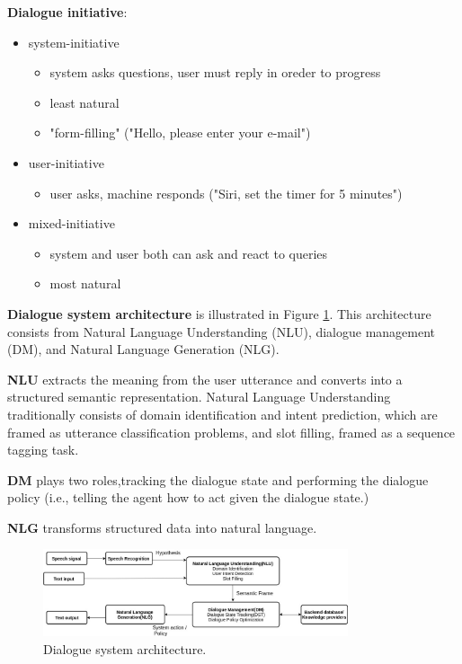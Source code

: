 \textbf{Dialogue initiative}:
\begin{itemize}
	\item system-initiative
		\begin{itemize}
			\item system asks questions, user must reply in oreder to progress
			\item least natural
			\item "form-filling" ("Hello, please enter your e-mail") 
		\end{itemize}
	\item user-initiative
		\begin{itemize}
			\item user asks, machine responds ("Siri, set the timer for 5 minutes")
		\end{itemize}
	\item mixed-initiative
		\begin{itemize}
			\item system and user both can ask and react to queries
			\item most natural
		\end{itemize}
\end{itemize}

\textbf{Dialogue system architecture} is illustrated in Figure \ref{ds architecture}. This architecture consists from Natural Language Understanding (NLU), dialogue management (DM), and Natural Language Generation (NLG).

\textbf{NLU} extracts the meaning from the user utterance and converts into a structured semantic representation. Natural Language Understanding traditionally consists of domain identification and intent prediction, which are framed as utterance classification problems, and slot filling, framed as a sequence tagging task.

\textbf{DM} plays two roles,tracking the dialogue state and performing the dialogue policy (i.e., telling the agent how to act given the dialogue state.)

\textbf{NLG} transforms structured data into natural language.\cite{open_domain_neural_ds}
\begin{figure}[hbt]
	\centering
	\includegraphics[width=0.8\textwidth]{figures/ds_arcitecture.jpg}
	\caption{Dialogue system architecture.}
	\label{ds architecture}
\end{figure}

